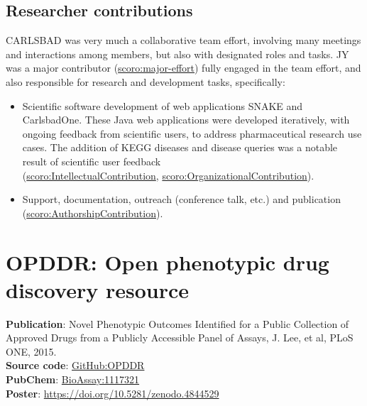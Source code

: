 \subsection{Researcher contributions}

CARLSBAD was very much a collaborative team effort, involving many meetings and interactions among members, but also with designated roles and tasks. JY was a major contributor (\href{http://purl.org/spar/scoro/major-effort}{scoro:major-effort}) fully engaged in the team effort, and also responsible for research and development tasks, specifically:

\begin{itemize}[topsep=0pt,itemsep=0pt,partopsep=0pt,parsep=0pt]
    \item Scientific software development of web applications SNAKE and CarlsbadOne. These Java web applications were developed iteratively, with ongoing feedback from scientific users, to address pharmaceutical research use cases. The addition of KEGG diseases and disease queries was a notable result of scientific user feedback\\ (\href{http://purl.org/spar/scoro/IntellectualContribution}{scoro:IntellectualContribution}, \href{http://purl.org/spar/scoro/OrganizationalContribution}{scoro:OrganizationalContribution}).
    \item Support, documentation, outreach (conference talk, etc.) and publication\\
    (\href{http://purl.org/spar/scoro/AuthorshipContribution}{scoro:AuthorshipContribution}). 
\end{itemize}

\newpage

\section{OPDDR: Open phenotypic drug discovery resource}
\label{section:opddr}

\textbf{Publication}: Novel Phenotypic Outcomes Identified for a Public Collection of Approved Drugs from a Publicly Accessible Panel of Assays, J. Lee, et al, PLoS ONE, 2015\cite{Lee2015-vg}.\\
\textbf{Source code}: \href{https://github.com/IUIDSL/OPDDR}{GitHub:OPDDR}\\
\textbf{PubChem}: \href{https://pubchem.ncbi.nlm.nih.gov/bioassay/1117321}{BioAssay:1117321}\\
\textbf{Poster}: \href{https://doi.org/10.5281/zenodo.4844529}{https://doi.org/10.5281/zenodo.4844529}

